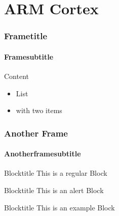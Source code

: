 \section{ARM Cortex}
\begin{frame}
    \frametitle{Frametitle}
    \framesubtitle{Framesubtitle}
    Content
    \begin{itemize}
        \item List
        \item with two items
    \end{itemize}
\end{frame}
\begin{frame}
    \frametitle{Another Frame}
    \framesubtitle{Anotherframesubtitle}
    \begin{block}{Blocktitle}
        This is a regular Block
    \end{block}
    \begin{alertblock}{Blocktitle}
        This is an alert Block
    \end{alertblock}
    \begin{exampleblock}{Blocktitle}
        This is an example Block
    \end{exampleblock}
\end{frame}
